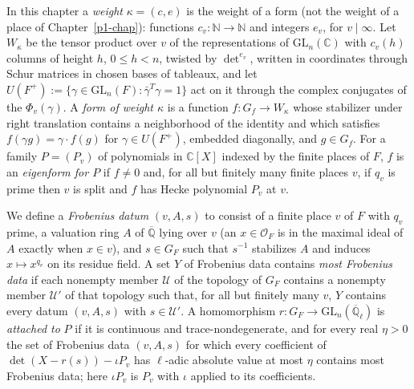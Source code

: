 \documentclass[reqno]{amsart}
\newcounter{chap}
\theoremstyle{definition}
\theoremstyle{plain}
\newcommand{\Q}{\mathbb{Q}}
\newcommand{\C}{\mathbb{C}}
\newcommand{\Qlb}{\overline{\Q}_\ell}
\newcommand{\Oc}{\mathcal{O}}
\newcommand{\Uc}{\mathcal{U}}
\newcommand{\GL}{\mathrm{GL}}
\begin{document}
In this chapter a \emph{weight} \(\kappa = (c, e)\) is the weight of a form (not the weight of a place of Chapter~\ref{p1-chap}): functions \(c_v \colon \mathbb{N} \to \mathbb{N}\) and integers \(e_v\), for \(v \mid \infty\).  Let \(W_\kappa\) be the tensor product over \(v\) of the representations of \(\GL_n(\C)\) with \(c_v(h)\) columns of height \(h\), \(0 \le h < n\), twisted by \(\det^{e_v}\), written in coordinates through Schur matrices in chosen bases of tableaux, and let \(U(F^+) := \{\gamma \in \GL_n(F) : \bar\gamma^T\gamma = 1\}\) act on it through the complex conjugates of the \(\Phi_v(\gamma)\).  A \emph{form of weight \(\kappa\)} is a function \(f \colon G_f \to W_\kappa\) whose stabilizer under right translation contains a neighborhood of the identity and which satisfies \(f(\gamma g) = \gamma \cdot f(g)\) for \(\gamma \in U(F^+)\), embedded diagonally, and \(g \in G_f\).  For a family \(P = (P_v)\) of polynomials in \(\C[X]\) indexed by the finite places of \(F\), \(f\) is an \emph{eigenform for \(P\)} if \(f \ne 0\) and, for all but finitely many finite places \(v\), if \(q_v\) is prime then \(v\) is split and \(f\) has Hecke polynomial \(P_v\) at \(v\).

We define a \emph{Frobenius datum} \((v, A, s)\) to consist of a finite place \(v\) of \(F\) with \(q_v\) prime, a valuation ring \(A\) of \(\overline{\Q}\) lying over \(v\) (an \(x \in \Oc_F\) is in the maximal ideal of \(A\) exactly when \(x \in v\)), and \(s \in G_F\) such that \(s^{-1}\) stabilizes \(A\) and induces \(x \mapsto x^{q_v}\) on its residue field.  A set \(Y\) of Frobenius data contains \emph{most Frobenius data} if each nonempty member \(\Uc\) of the topology of \(G_F\) contains a nonempty member \(\Uc'\) of that topology such that, for all but finitely many \(v\), \(Y\) contains every datum \((v, A, s)\) with \(s \in \Uc'\).  A homomorphism \(r \colon G_F \to \GL_n(\Qlb)\) is \emph{attached to} \(P\) if it is continuous and trace-nondegenerate, and for every real \(\eta > 0\) the set of Frobenius data \((v, A, s)\) for which every coefficient of \(\det(X - r(s)) - \iota P_v\) has \(\ell\)-adic absolute value at most \(\eta\) contains most Frobenius data; here \(\iota P_v\) is \(P_v\) with \(\iota\) applied to its coefficients.
\end{document}
